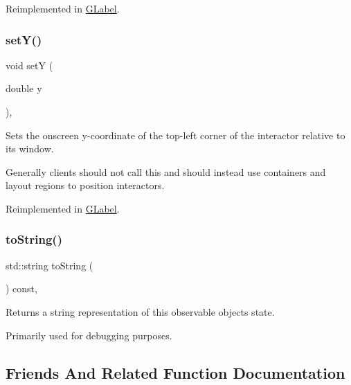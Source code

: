 Reimplemented in \mbox{\hyperlink{classsgl_1_1GLabel_a173837ba805eaa2411e88834869d3a9c}{G\+Label}}.

\mbox{\label{classsgl_1_1GInteractor_a7d57e2a5c35d27feb58fd498a3cf82b9}} 
\subsubsection{\texorpdfstring{set\+Y()}{setY()}}
{\footnotesize\ttfamily void setY (\begin{DoxyParamCaption}\item[{double}]{y }\end{DoxyParamCaption})\hspace{0.3cm}{\ttfamily [virtual]}, {\ttfamily [inherited]}}



Sets the onscreen y-\/coordinate of the top-\/left corner of the interactor relative to its window. 

Generally clients should not call this and should instead use containers and layout regions to position interactors. 

Reimplemented in \mbox{\hyperlink{classsgl_1_1GLabel_a0b738606c7aca5c472b66c4e55b3c685}{G\+Label}}.

\mbox{\label{classsgl_1_1GObservable_a1fe5121d6528fdea3f243321b3fa3a49}} 
\subsubsection{\texorpdfstring{to\+String()}{toString()}}
{\footnotesize\ttfamily std\+::string to\+String (\begin{DoxyParamCaption}{ }\end{DoxyParamCaption}) const\hspace{0.3cm}{\ttfamily [virtual]}, {\ttfamily [inherited]}}



Returns a string representation of this observable object\textquotesingle{}s state. 

Primarily used for debugging purposes. 

\subsection{Friends And Related Function Documentation}
\mbox{\label{classsgl_1_1GContainer_a20230fe9431fcdad4afa6bfec61b5833}} 
